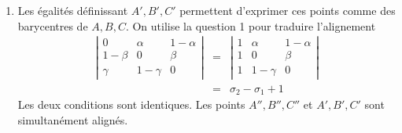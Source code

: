 \begin{enumerate}
\begin{enumerate}
      \item Les {\'e}galit{\'e}s d{\'e}finissant $A',B',C'$ permettent
      d'exprimer ces points comme des barycentres de $A,B,C$. On utilise
      la question 1 pour traduire l'alignement
\begin{eqnarray*}
\left|\begin{array}{ccc}
    0 & \alpha & 1-\alpha\\
  1-\beta & 0 & \beta\\
  \gamma & 1-\gamma & 0
  \end{array}\right|  & =&
\left|\begin{array}{ccc}
    1 & \alpha & 1-\alpha\\
  1 &  0 & \beta\\
  1 & 1-\gamma & 0
  \end{array}\right|\\
  &=&\sigma_2- \sigma_1 +1
\end{eqnarray*}
Les deux conditions sont identiques. Les points $A'',B'',C''$ et
$A',B',C'$ sont simultan{\'e}ment align{\'e}s.
    \end{enumerate}
\end{enumerate}
